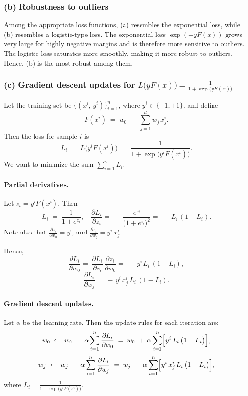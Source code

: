\subsubsection*{(b) Robustness to outliers}

Among the appropriate loss functions, (a) resembles the exponential loss, while (b) resembles a logistic-type loss. 
The exponential loss $\exp(-yF(x))$ grows very large for highly negative margins and is therefore 
more sensitive to outliers. The logistic loss saturates more smoothly, making it more robust to outliers.
Hence, (b) is the most robust among them.

\subsubsection*{(c) Gradient descent updates for $L\bigl(yF(x)\bigr)=\frac{1}{1+\exp\bigl(yF(x)\bigr)}$}

Let the training set be $\{(x^i,\,y^i)\}_{i=1}^n$, where $y^i\in\{-1,+1\}$, and define 
\[
F(x^i) \;=\; w_0 \;+\;\sum_{j=1}^d w_j\,x_j^i.
\]
Then the loss for sample $i$ is
\[
L_i \;=\; L\bigl(y^i F(x^i)\bigr)
     \;=\; \frac{1}{1 + \exp\bigl(y^i F(x^i)\bigr)}.
\]
We want to minimize the sum $\displaystyle \sum_{i=1}^n L_i$.

\paragraph{Partial derivatives.}
Let $z_i = y^i F(x^i)$. Then
\[
L_i \;=\; \frac{1}{1 + e^{z_i}}, 
\quad
\frac{\partial L_i}{\partial z_i} 
=\; -\,\frac{e^{z_i}}{\bigl(1 + e^{z_i}\bigr)^2}
=\; -\,L_i\,(1 - L_i).
\]
Note also that 
\(\displaystyle \frac{\partial z_i}{\partial w_0} = y^i\),
and 
\(\displaystyle \frac{\partial z_i}{\partial w_j} = y^i\,x_j^i.\)

Hence,
\[
\frac{\partial L_i}{\partial w_0}
=\; \frac{\partial L_i}{\partial z_i}\,\frac{\partial z_i}{\partial w_0}
=\; -\,y^i\,L_i\,(1 - L_i),
\]
\[
\frac{\partial L_i}{\partial w_j}
=\; -\,y^i\,x_j^i\,L_i\,(1 - L_i).
\]

\paragraph{Gradient descent updates.}
Let $\alpha$ be the learning rate. Then the update rules for each iteration are:
\[
w_0 \;\leftarrow\; w_0 \;-\; \alpha \sum_{i=1}^n \frac{\partial L_i}{\partial w_0}
\;=\; w_0 \;+\; \alpha \sum_{i=1}^n 
     \Bigl[y^i\,L_i\,\bigl(1 - L_i\bigr)\Bigr],
\]
\[
w_j \;\leftarrow\; w_j \;-\; \alpha \sum_{i=1}^n \frac{\partial L_i}{\partial w_j}
\;=\; w_j \;+\; \alpha \sum_{i=1}^n 
     \Bigl[y^i\,x_j^i\,L_i\,\bigl(1 - L_i\bigr)\Bigr],
\]
where 
\(\displaystyle L_i = \frac{1}{1 + \exp\bigl(y^i F(x^i)\bigr)}.\)